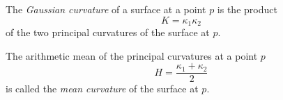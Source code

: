 \documentclass[12pt]{article}
\begin{document}
The \emph{Gaussian curvature} of a surface at a point $p$ is the product 
$$
K = \kappa_1 \kappa_2
$$
of the two principal curvatures of the surface at $p$.

The arithmetic mean of the principal curvatures at a point $p$
$$
H = \frac{\kappa_1 + \kappa_2}{2}
$$
is called the \emph{mean curvature} of the surface at 
$p$.
\end{document}
